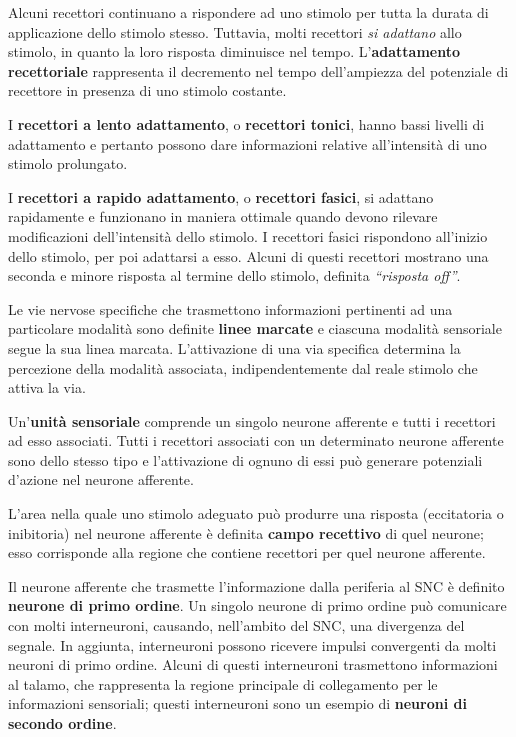 \documentclass[]{article}
\begin{document}
Alcuni recettori continuano a rispondere ad uno stimolo per tutta la
durata di applicazione dello stimolo stesso. Tuttavia, molti recettori
\emph{si adattano} allo stimolo, in quanto la loro risposta diminuisce
nel tempo. L'\textbf{adattamento recettoriale} rappresenta il decremento
nel tempo dell'ampiezza del potenziale di recettore in presenza di uno
stimolo costante.

I \textbf{recettori a lento adattamento}, o \textbf{recettori tonici},
hanno bassi livelli di adattamento e pertanto possono dare informazioni
relative all'intensità di uno stimolo prolungato.

I \textbf{recettori a rapido adattamento}, o \textbf{recettori fasici},
si adattano rapidamente e funzionano in maniera ottimale quando devono
rilevare modificazioni dell'intensità dello stimolo. I recettori fasici
rispondono all'inizio dello stimolo, per poi adattarsi a esso. Alcuni di
questi recettori mostrano una seconda e minore risposta al termine dello
stimolo, definita \emph{``risposta off''}.

Le vie nervose specifiche che trasmettono informazioni pertinenti ad una
particolare modalità sono definite \textbf{linee marcate} e ciascuna
modalità sensoriale segue la sua linea marcata. L'attivazione di una via
specifica determina la percezione della modalità associata,
indipendentemente dal reale stimolo che attiva la via.

Un'\textbf{unità sensoriale} comprende un singolo neurone afferente e
tutti i recettori ad esso associati. Tutti i recettori associati con un
determinato neurone afferente sono dello stesso tipo e l'attivazione di
ognuno di essi può generare potenziali d'azione nel neurone afferente.

L'area nella quale uno stimolo adeguato può produrre una risposta
(eccitatoria o inibitoria) nel neurone afferente è definita
\textbf{campo recettivo} di quel neurone; esso corrisponde alla regione
che contiene recettori per quel neurone afferente.

Il neurone afferente che trasmette l'informazione dalla periferia al SNC
è definito \textbf{neurone di primo ordine}. Un singolo neurone di primo
ordine può comunicare con molti interneuroni, causando, nell'ambito del
SNC, una divergenza del segnale. In aggiunta, interneuroni possono
ricevere impulsi convergenti da molti neuroni di primo ordine. Alcuni di
questi interneuroni trasmettono informazioni al talamo, che rappresenta
la regione principale di collegamento per le informazioni sensoriali;
questi interneuroni sono un esempio di \textbf{neuroni di secondo
ordine}.
\end{document}
